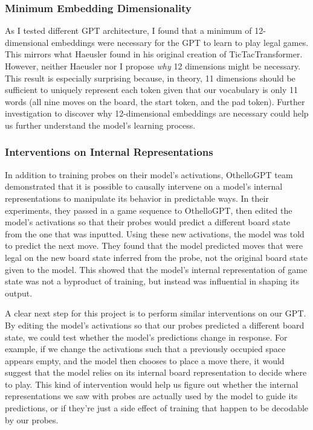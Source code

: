 \documentclass[11pt]{article}
\begin{document}
\subsubsection{Minimum Embedding
Dimensionality}\label{minimum-embedding-dimensionality}

As I tested different GPT architecture, I found that a minimum of
12-dimensional embeddings were necessary for the GPT to learn to play
legal games. This mirrors what Haeusler found in his original creation
of TicTacTransformer. However, neither Haeusler nor I propose \emph{why}
12 dimensions might be necessary. This result is especially surprising
because, in theory, 11 dimensions should be sufficient to uniquely
represent each token given that our vocabulary is only 11 words (all
nine moves on the board, the start token, and the pad token). Further
investigation to discover why 12-dimensional embeddings are necessary
could help us further understand the model's learning process.

\subsubsection{Interventions on Internal
Representations}\label{interventions-on-internal-representations}

In addition to training probes on their model's activations, OthelloGPT
team demonstrated that it is possible to causally intervene on a model's
internal representations to manipulate its behavior in predictable ways.
In their experiments, they passed in a game sequence to OthelloGPT, then
edited the model's activations so that their probes would predict a
different board state from the one that was inputted. Using these new
activations, the model was told to predict the next move. They found
that the model predicted moves that were legal on the new board state
inferred from the probe, not the original board state given to the
model. This showed that the model's internal representation of game
state was not a byproduct of training, but instead was influential in
shaping its output.

A clear next step for this project is to perform similar interventions
on our GPT. By editing the model's activations so that our probes
predicted a different board state, we could test whether the model's
predictions change in response. For example, if we change the
activations such that a previously occupied space appears empty, and the
model then chooses to place a move there, it would suggest that the
model relies on its internal board representation to decide where to
play. This kind of intervention would help us figure out whether the
internal representations we saw with probes are actually used by the
model to guide its predictions, or if they're just a side effect of
training that happen to be decodable by our probes.
\end{document}
